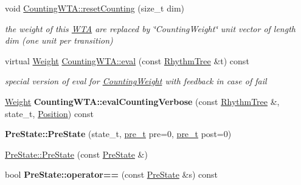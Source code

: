\begin{DoxyCompactItemize}
\mbox{\label{group__schemata_ga5c94f5191975a32e951e7d39ac606dc0}} 
void \mbox{\hyperlink{group__schemata_ga5c94f5191975a32e951e7d39ac606dc0}{Counting\+W\+T\+A\+::reset\+Counting}} (size\+\_\+t dim)
\begin{DoxyCompactList}\small\item\em the weight of this \mbox{\hyperlink{classWTA}{W\+TA}} are replaced by \char`\"{}\+Counting\+Weight\char`\"{} unit vector of length dim (one unit per transition) \end{DoxyCompactList}\item 
\mbox{\label{group__schemata_ga2665883ffe41001dd7c2568bc9bef02f}} 
virtual \mbox{\hyperlink{classWeight}{Weight}} \mbox{\hyperlink{group__schemata_ga2665883ffe41001dd7c2568bc9bef02f}{Counting\+W\+T\+A\+::eval}} (const \mbox{\hyperlink{classRhythmTree}{Rhythm\+Tree}} \&t) const
\begin{DoxyCompactList}\small\item\em special version of eval for \mbox{\hyperlink{classCountingWeight}{Counting\+Weight}} with feedback in case of fail \end{DoxyCompactList}\item 
\mbox{\label{group__schemata_ga3a6ae649f73205b3390f82c3f996f6a3}} 
\mbox{\hyperlink{classWeight}{Weight}} {\bfseries Counting\+W\+T\+A\+::eval\+Counting\+Verbose} (const \mbox{\hyperlink{classRhythmTree}{Rhythm\+Tree}} \&, state\+\_\+t, \mbox{\hyperlink{classPosition}{Position}}) const
\item 
\mbox{\label{group__schemata_gae43261a1dcc43a298836fbe62912f8a8}} 
{\bfseries Pre\+State\+::\+Pre\+State} (state\+\_\+t, \mbox{\hyperlink{group__general_ga092fe8b972dfa977c2a0886720a7731e}{pre\+\_\+t}} pre=0, \mbox{\hyperlink{group__general_ga092fe8b972dfa977c2a0886720a7731e}{pre\+\_\+t}} post=0)
\item 
\mbox{\hyperlink{group__schemata_gabc0c5bcc094646426f0a90313808907b}{Pre\+State\+::\+Pre\+State}} (const \mbox{\hyperlink{classPreState}{Pre\+State}} \&)
\item 
\mbox{\label{group__schemata_gad8b20db3eff6b527dbbc19bb92f2649d}} 
bool {\bfseries Pre\+State\+::operator==} (const \mbox{\hyperlink{classPreState}{Pre\+State}} \&s) const
\item 

\end{DoxyCompactItemize}
